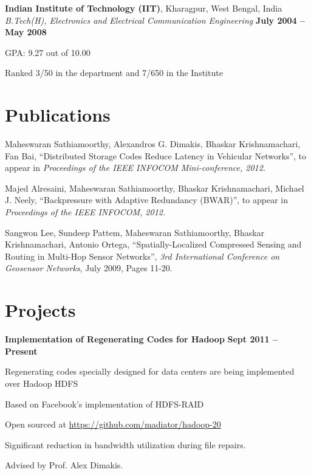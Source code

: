 \documentclass[margin,line]{resume}
\begin{document}
\begin{resume}
    
    \textbf{Indian Institute of Technology (IIT)}, Kharagpur, West Bengal, India \\%
    \textsl{B.Tech(H), Electronics and Electrical Communication Engineering} \hfill \textbf{ July 2004 -- May 2008}\vspace{-3mm}\\\vspace{-1mm}%
    \begin{list2}
    		\item GPA:	9.27 out of 10.00
    		\item Ranked 3/50 in the department and 7/650 in the Institute        
    \end{list2}\vspace{-1.5mm}%


\section{\mysidestyle Publications}
\begin{list2}
    \item Maheswaran Sathiamoorthy, Alexandros G. Dimakis, Bhaskar Krishnamachari, Fan Bai, 
    ``Distributed Storage Codes Reduce Latency in Vehicular Networks'', 
    to appear in \textsl{Proceedings of the IEEE INFOCOM Mini-conference, 2012.}
    \item Majed Alresaini, Maheswaran Sathiamoorthy, Bhaskar Krishnamachari, Michael J. Neely, ``Backpressure with Adaptive Redundancy (BWAR)'', 
    to appear in \textsl{Proceedings of the IEEE INFOCOM, 2012.}
    \item Sangwon Lee, Sundeep Pattem, Maheswaran Sathiamoorthy, Bhaskar Krishnamachari, Antonio Ortega, ``Spatially-Localized Compressed Sensing and Routing in Multi-Hop Sensor Networks'', \textsl{3rd International Conference on Geosensor Networks}, July 2009, Pages 11-20.  
    \end{list2}


\section{\mysidestyle Projects}
  \textbf{Implementation of Regenerating Codes for Hadoop} \hfill \textbf{Sept 2011 -- Present}
  \begin{list2}
   \item Regenerating codes specially designed for data centers are being implemented over Hadoop HDFS
   \item Based on Facebook's implementation of HDFS-RAID
   \item Open sourced at \href{https://github.com/madiator/hadoop-20}{https://github.com/madiator/hadoop-20}
   \item Significant reduction in bandwidth utilization during file repairs.
   \item Advised by Prof. Alex Dimakis. 
  \end{list2}
  

\end{resume}
\end{document}

